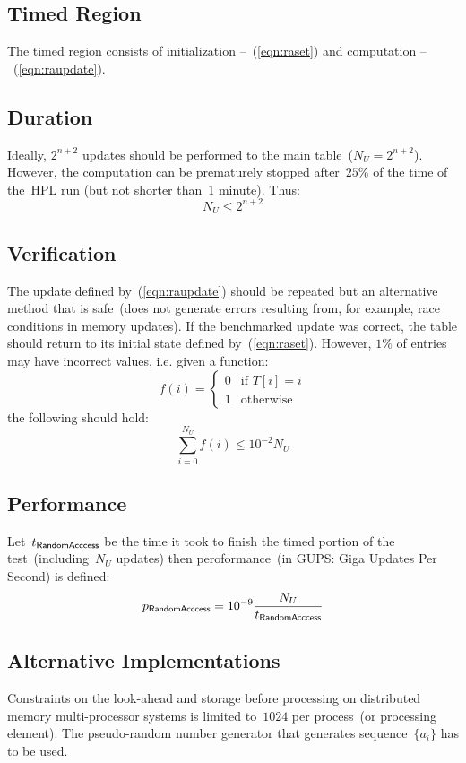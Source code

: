 \documentclass[twocolumn,draft]{article}
\newcommand{\HPL}{\textsf{HPL}\xspace}
\newcommand{\randa}{\textsf{\scriptsize RandomAcccess}\xspace}
\begin{document}
\subsection{Timed Region}
The timed region consists of initialization --~(\ref{eqn:raset}) and
computation --~(\ref{eqn:raupdate}).

\subsection{Duration}
Ideally, $2^{n+2}$ updates should be performed to the main
table~($N_U=2^{n+2}$). However, the computation can be prematurely stopped
after~$25\%$ of the time of the~\HPL run (but not shorter than~$1$ minute). Thus:
\begin{equation}
  N_U \le 2^{n+2}
\end{equation}

\subsection{Verification}
The update defined by~(\ref{eqn:raupdate}) should be repeated but an
alternative method that is safe~(does not generate errors resulting from, for
example, race conditions in memory updates). If the benchmarked update was
correct, the table should return to its initial state defined
by~(\ref{eqn:raset}). However, $1\%$ of entries may have incorrect values,
i.e. given a function:
\begin{equation}
  f(i) = \left\{\begin{array}{ll}0 & \textrm{if } T[i]=i \\ 1 & \textrm{otherwise} \end{array}\right.
\end{equation}
the following should hold:
\begin{equation}
  \sum_{i=0}^{N_U}f(i) \le 10^{-2}N_U
\end{equation}

\subsection{Performance}
Let~$t_{\randa}$ be the time it took to finish the timed portion of the
test~(including~$N_U$ updates) then peroformance~(in GUPS: Giga Updates Per
Second) is defined:
\begin{equation}
  p_{\randa} = 10^{-9} \frac{N_U}{t_{\randa}}
\end{equation}

\subsection{Alternative Implementations}
Constraints on the look-ahead and storage before processing on distributed
memory multi-processor systems is limited to~$1024$ per process~(or processing
element). The pseudo-random number generator that generates sequence~$\{a_i\}$
has to be used.
\end{document}
